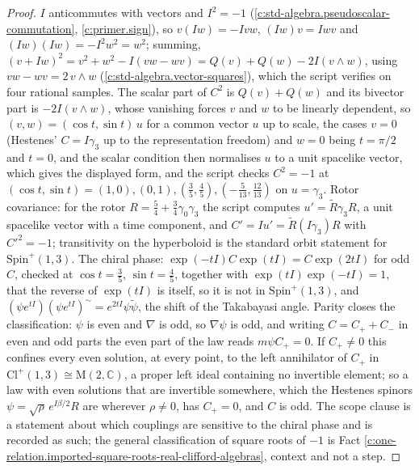 \documentclass[11pt]{article}
\theoremstyle{definition}
\theoremstyle{plain}
\providecommand{\C}{}\renewcommand{\C}{\mathbb{C}}
\providecommand{\Cl}{}\renewcommand{\Cl}{\mathrm{Cl}}
\providecommand{\Mat}{}\renewcommand{\Mat}{\mathrm{M}}
\begin{document}
\begin{proof}
$I$ anticommutes with vectors and $I^{2} = -1$ (\ref{c:std-algebra.pseudoscalar-commutation}, \ref{c:primer.sign}), so $v(Iw) = -Ivw$, $(Iw)v = Iwv$ and $(Iw)(Iw) = -I^{2}w^{2} = w^{2}$; summing, $(v + Iw)^{2} = v^{2} + w^{2} - I(vw - wv) = Q(v) + Q(w) - 2I(v \wedge w)$, using $vw - wv = 2\,v \wedge w$ (\ref{c:std-algebra.vector-squares}), which the script verifies on four rational samples. The scalar part of $C^{2}$ is $Q(v) + Q(w)$ and its bivector part is $-2I(v \wedge w)$, whose vanishing forces $v$ and $w$ to be linearly dependent, so $(v, w) = (\cos t, \sin t)\,u$ for a common vector $u$ up to scale, the cases $v = 0$ (Hestenes' $C = I\gamma_{3}$ up to the representation freedom) and $w = 0$ being $t = \pi/2$ and $t = 0$, and the scalar condition then normalises $u$ to a unit spacelike vector, which gives the displayed form, and the script checks $C^{2} = -1$ at $(\cos t, \sin t) = (1, 0), (0, 1), (\tfrac35, \tfrac45), (-\tfrac{5}{13}, \tfrac{12}{13})$ on $u = \gamma_{3}$. Rotor covariance: for the rotor $R = \tfrac54 + \tfrac34\gamma_{0}\gamma_{3}$ the script computes $u' = \tilde{R}\gamma_{3}R$, a unit spacelike vector with a time component, and $C' = Iu' = \tilde{R}(I\gamma_{3})R$ with $C'^{2} = -1$; transitivity on the hyperboloid is the standard orbit statement for $\mathrm{Spin}^{+}(1,3)$. The chiral phase: $\exp(-tI)C\exp(tI) = C\exp(2tI)$ for odd $C$, checked at $\cos t = \tfrac35$, $\sin t = \tfrac45$, together with $\exp(tI)\exp(-tI) = 1$, that the reverse of $\exp(tI)$ is itself, so it is not in $\mathrm{Spin}^{+}(1,3)$, and $(\psi e^{tI})(\psi e^{tI})^{\sim} = e^{2tI}\psi\tilde{\psi}$, the shift of the Takabayasi angle. Parity closes the classification: $\psi$ is even and $\nabla$ is odd, so $\nabla\psi$ is odd, and writing $C = C_{+} + C_{-}$ in even and odd parts the even part of the law reads $m\psi C_{+} = 0$. If $C_{+} \neq 0$ this confines every even solution, at every point, to the left annihilator of $C_{+}$ in $\Cl^{+}(1,3) \cong \Mat(2, \C)$, a proper left ideal containing no invertible element; so a law with even solutions that are invertible somewhere, which the Hestenes spinors $\psi = \sqrt{\rho}\,e^{I\beta/2}R$ are wherever $\rho \neq 0$, has $C_{+} = 0$, and $C$ is odd. The scope clause is a statement about which couplings are sensitive to the chiral phase and is recorded as such; the general classification of square roots of $-1$ is Fact \ref{c:one-relation.imported-square-roots-real-clifford-algebras}, context and not a step.

\end{proof}
\end{document}
